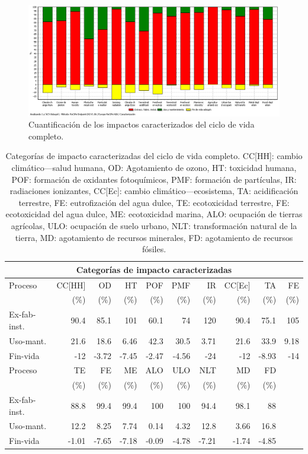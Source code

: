 \begin{figure}[!htb]
\centering
\includegraphics[width=15cm]{img/completo_caracterizacion.png}
\caption{Cuantificación de los impactos caracterizados del ciclo de vida completo.}
\label{fig:completo_caracterizacion}
\end{figure}

\begin{table}[!htb]
\centering
\begin{tabular}{p{2cm}rrrrrrrrr}
\toprule
\multicolumn{10}{c}{Categorías de impacto caracterizadas}\\
\midrule
Proceso & CC[HH] & OD & HT & POF & PMF & IR & CC[Ec] & TA & FE\\
 &  (\%) & (\%) & (\%) & (\%) & (\%) & (\%) & (\%) & (\%) & (\%)\\
\midrule
Ex-fab-inst. & 90.4 & 85.1 & 101 & 60.1 & 74 & 120 & 90.4 & 75.1& 105\\
Uso-mant. & 21.6 & 18.6 & 6.46 & 42.3 & 30.5 & 3.71 & 21.6 & 33.9 & 9.18\\
Fin-vida & -12 & -3.72 & -7.45 & -2.47 & -4.56 & -24 & -12 & -8.93 & -14\\
\midrule
\midrule
Proceso & TE & FE & ME & ALO & ULO & NLT & MD & FD\\
 &  (\%) & (\%) & (\%) & (\%) & (\%) & (\%) & (\%) & (\%)\\
\midrule
Ex-fab-inst. & 88.8 & 99.4 & 99.4 & 100 & 100 & 94.4 & 98.1 & 88\\
Uso-mant. & 12.2 & 8.25 & 7.74 & 0.14 & 4.32 & 12.8 & 3.66 & 16.8\\
Fin-vida & -1.01 & -7.65 & -7.18 & -0.09 & -4.78 & -7.21 & -1.74 & -4.85\\
\bottomrule
\end{tabular}
\caption[Categorías de impacto caracterizadas del ciclo de vida completo.]{Categorías de impacto caracterizadas del ciclo de vida completo. CC[HH]: cambio climático—salud humana, OD: Agotamiento de ozono, HT: toxicidad humana, POF: formación de oxidantes fotoquímicos, PMF: formación de partículas, IR: radiaciones ionizantes, CC[Ec]: cambio climático—ecosistema, TA: acidificación terrestre, FE: eutrofización del agua dulce, TE: ecotoxicidad terrestre, FE: ecotoxicidad del agua dulce, ME: ecotoxicidad marina, ALO: ocupación de tierras agrícolas, ULO: ocupación de suelo urbano, NLT: transformación natural de la tierra, MD: agotamiento de recursos minerales, FD: agotamiento de recursos fósiles.}
\label{categoriasimpactocompletocaracterizados}
\end{table}

